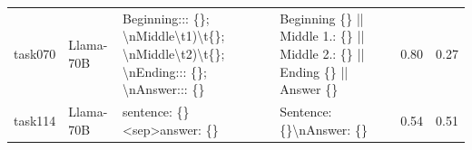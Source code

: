 \begin{longtable}{@{}p{0.8cm\tiny}p{1cm\tiny}p{4.1cm\ttfamily\tiny}p{4.1cm\ttfamily\tiny}p{0.8cm\tiny}p{0.8cm\tiny}@{}}
task070   & Llama-70B  & Beginning::: \{\}; \textbackslash{}nMiddle\textbackslash{}t1)\textbackslash{}t\{\}; \textbackslash{}nMiddle\textbackslash{}t2)\textbackslash{}t\{\}; \textbackslash{}nEnding::: \{\}; \textbackslash{}nAnswer::: \{\}                                                                                                                                                                                                                                                                                                   & Beginning \{\} || Middle  1.: \{\} || Middle  2.: \{\} || Ending \{\} || Answer \{\}                                                                                                                                                                                                                                                                                                                                                                                                                                                                                              & 0.80 & 0.27 \\
task114   & Llama-70B  & sentence: \{\} \textless{}sep\textgreater answer: \{\}                                                                                                                                                                                                                                                                                                                                                                                                                                                                  & Sentence: \{\}\textbackslash{}nAnswer: \{\}                                                                                                                                                                                                                                                                                                                                                                                                                                                                                                                                       & 0.54 & 0.51 \\

\end{longtable}
